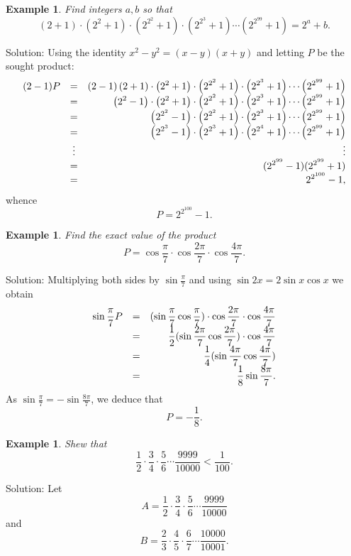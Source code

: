 \documentclass[11pt, openany]{book}
\theoremstyle{change} \theoremheaderfont{\blue\sffamily\bfseries}
\newtheorem{exa}[thm]{Example}
\theoremstyle{nonumberplain} \theoremheaderfont{\sffamily\bfseries}
\newcommand{\í}{\'{\i}}
\begin{document}
\begin{exa} Find integers $a, b$ so that
$$ \left(2 + 1\right)\cdot \left(2^2 + 1\right)\cdot\left(2^{2^{2}} + 1\right)
\cdot\left(2^{2^{3}} + 1\right)\cdots \left(2^{2^{99}} + 1\right)
= 2^a + b .$$ \end{exa} Solution: Using the identity $x^2 - y^2 =
(x - y)(x + y)$ and letting $P$ be the sought product:
$${\everymath{\displaystyle}\begin{array}{lcr}(2 - 1)P & = & (2 - 1)\left(2 + 1\right)\cdot \left(2^2
+ 1\right)\cdot\left(2^{2^{2}} + 1\right)
\cdot\left(2^{2^{3}} + 1\right)\cdots \left(2^{2^{99}} + 1\right) \\
& = & \left(2^2 - 1\right)\cdot \left(2^2 +
1\right)\cdot\left(2^{2^{2}} + 1\right)
\cdot\left(2^{2^{3}} + 1\right)\cdots \left(2^{2^{99}} + 1\right) \\
& = & \left(2^{2^{2}} - 1\right)\cdot\left(2^{2^{2}} + 1\right)
\cdot\left(2^{2^{3}} + 1\right)\cdots \left(2^{2^{99}} + 1\right) \\
& = & \left(2^{2^{3}} - 1\right)\cdot\left(2^{2^{3}} + 1\right)
\cdot\left(2^{2^{4}} + 1\right)\cdots \left(2^{2^{99}} + 1\right) \\
& \vdots & \vdots \\
& = & (2^{2^{99}} - 1)(2^{2^{99}} + 1) \\
& = & 2^{2^{100}} - 1,
\end{array}}$$ whence
$$P = 2^{2^{100}} - 1.$$

\begin{exa} Find the exact value of the product
$$ P = \cos \frac{\pi}{7}\cdot\cos \frac{2\pi}{7}\cdot\cos \frac{4\pi}{7}.$$
\end{exa}
Solution: Multiplying both sides by $\sin \frac{\pi}{7}$ and using
$\sin 2x = 2 \sin x \cos x$ we obtain
$${\everymath{\displaystyle}\begin{array}{lcr}
\sin \frac{\pi}{7}P & = & (\sin \frac{\pi}{7}\cos \frac{\pi}{7})\cdot\cos \frac{2\pi}{7}\cdot\cos \frac{4\pi}{7} \\
& = & \frac{1}{2}(\sin \frac{2\pi}{7}\cos \frac{2\pi}{7})\cdot\cos \frac{4\pi}{7} \\
& = & \frac{1}{4}(\sin \frac{4\pi}{7}\cos \frac{4\pi}{7}) \\
& = & \frac{1}{8}\sin \frac{8\pi}{7}.


\end{array}}$$
As $\sin \frac{\pi}{7} = -\sin \frac{8\pi}{7}$, we deduce that
$$P = - \frac{1}{8}.$$

\begin{exa}
Shew that $$\frac{1}{2}\cdot\frac{3}{4}\cdot\frac{5}{6}\cdots
\frac{9999}{10000} < \frac{1}{100}.$$
\end{exa}
Solution: Let
$$A = \frac{1}{2}\cdot\frac{3}{4}\cdot\frac{5}{6}\cdots \frac{9999}{10000} $$
and
$$ B =\frac{2}{3}\cdot\frac{4}{5}\cdot\frac{6}{7}\cdots\frac{10000}{10001}.$$
\end{document}
